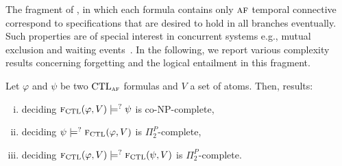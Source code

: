 \documentclass{article}
\begin{document}
The fragment of \CTL, in which each formula contains only $\textsc{a} \textsc{f}$ temporal connective correspond to specifications that are desired to hold in all branches eventually. Such properties are of special interest in concurrent systems e.g., mutual exclusion and  waiting events~\cite{Baier:PMC:2008}.
In the following, we report various complexity results concerning forgetting and the logical entailment in this fragment.

\begin{theorem}\label{thm:comF}
Let $\varphi$ and $\psi$ be two $\textrm{CTL}_{\textsc{a} \textsc{f}}$ formulas and $V$ a set of atoms. Then,
results:
\begin{enumerate}[(i)]
  \item deciding  ${\textsc{f}_{\textrm{CTL}}}(\varphi, V ) \models^? \psi$ is co-NP-complete,
  \item deciding  $\psi \models^? {\textsc{f}_{\textrm{CTL}}}(\varphi, V)$ is $\Pi_2^P$-complete,
  \item deciding ${\textsc{f}_{\textrm{CTL}}}(\varphi, V) \models^? {\textsc{f}_{\textrm{CTL}}}(\psi, V)$ is $\Pi_2^P$-complete.
\end{enumerate}
\end{theorem}
\end{document}
